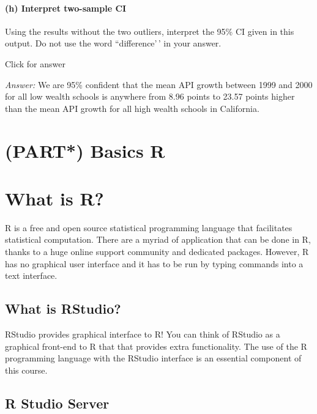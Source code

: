 \documentclass[
]{book}
\begin{document}
\hypertarget{h-interpret-two-sample-ci}{%
\subsubsection{(h) Interpret two-sample CI}\label{h-interpret-two-sample-ci}}

Using the results without the two outliers, interpret the 95\% CI given in this output. Do not use the word ``difference'\,' in your answer.

Click for answer

\emph{Answer:} We are 95\% confident that the mean API growth between 1999 and 2000 for all low wealth schools is anywhere from 8.96 points to 23.57 points higher than the mean API growth for all high wealth schools in California.

\hypertarget{part-basics-r}{%
\chapter{(PART*) Basics R}\label{part-basics-r}}

\hypertarget{what-is-r}{%
\chapter{What is R?}\label{what-is-r}}

R is a free and open source statistical programming language that facilitates statistical computation. There are a myriad of application that can be done in R, thanks to a huge online support community and dedicated packages. However, R has no graphical user interface and it has to be run by typing commands into a text interface.

\hypertarget{what-is-rstudio}{%
\section{What is RStudio?}\label{what-is-rstudio}}

RStudio provides graphical interface to R! You can think of RStudio as a graphical front-end to R that that provides extra functionality. The use of the R programming language with the RStudio interface is an essential component of this course.

\hypertarget{r-studio-server}{%
\section{R Studio Server}\label{r-studio-server}}
\end{document}
